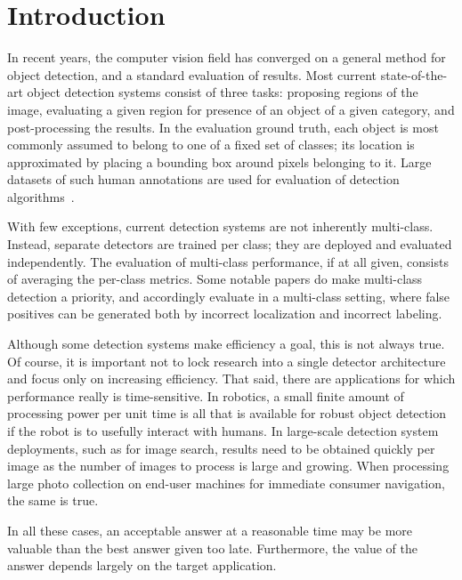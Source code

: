 \section{Introduction}

In recent years, the computer vision field has converged on a general method for object detection, and a standard evaluation of results.
Most current state-of-the-art object detection systems consist of three tasks: proposing regions of the image, evaluating a given region for presence of an object of a given category, and post-processing the results.
In the evaluation ground truth, each object is most commonly assumed to belong to one of a fixed set of classes; its location is approximated by placing a bounding box around pixels belonging to it.
Large datasets of such human annotations are used for evaluation of detection algorithms~\cite{pascal-voc-2010}.

With few exceptions, current detection systems are not inherently multi-class.
Instead, separate detectors are trained per class; they are deployed and evaluated independently.
The evaluation of multi-class performance, if at all given, consists of averaging the per-class metrics.
Some notable papers do make multi-class detection a priority, and accordingly evaluate in a multi-class setting, where false positives can be generated both by incorrect localization and incorrect labeling.

Although some detection systems make efficiency a goal, this is not always true.
Of course, it is important not to lock research into a single detector architecture and focus only on increasing efficiency.
That said, there are applications for which performance really is time-sensitive.
In robotics, a small finite amount of processing power per unit time is all that is available for robust object detection if the robot is to usefully interact with humans.
In large-scale detection system deployments, such as for image search, results need to be obtained quickly per image as the number of images to process is large and growing.
When processing large photo collection on end-user machines for immediate consumer navigation, the same is true.

In all these cases, an acceptable answer at a reasonable time may be more valuable than the best answer given too late.
Furthermore, the value of the answer depends largely on the target application.

